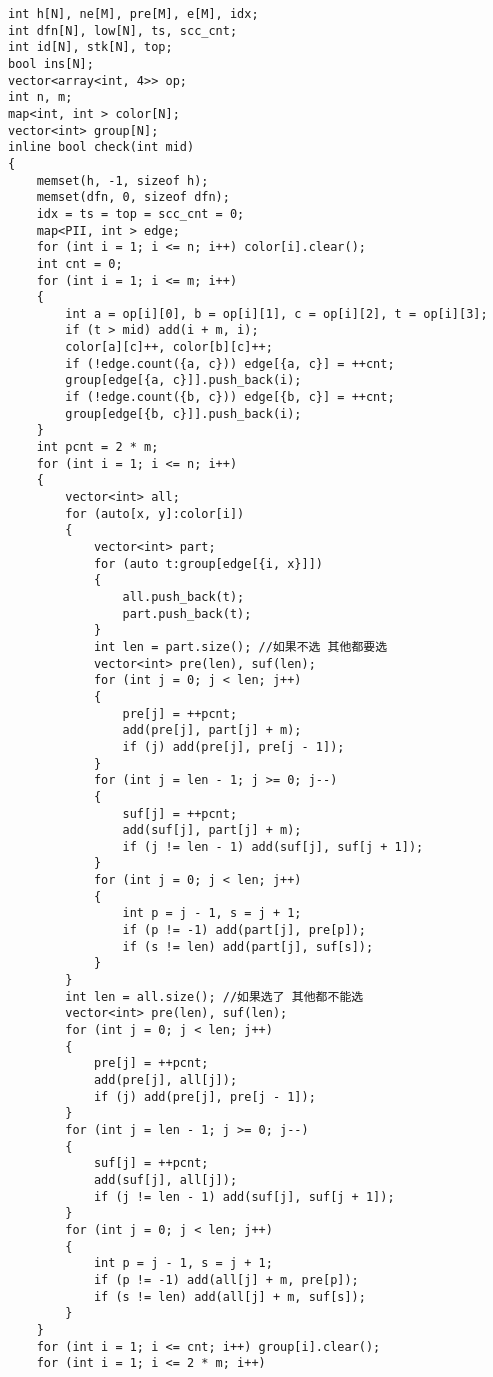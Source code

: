 \documentclass[a4paper, fontset=none]{ctexart}
\begin{document}
\begin{verbatim}
int h[N], ne[M], pre[M], e[M], idx;
int dfn[N], low[N], ts, scc_cnt;
int id[N], stk[N], top;
bool ins[N];
vector<array<int, 4>> op;
int n, m;
map<int, int > color[N];
vector<int> group[N];
inline bool check(int mid)
{
    memset(h, -1, sizeof h);
    memset(dfn, 0, sizeof dfn);
    idx = ts = top = scc_cnt = 0;
    map<PII, int > edge;
    for (int i = 1; i <= n; i++) color[i].clear();
    int cnt = 0;
    for (int i = 1; i <= m; i++)
    {
        int a = op[i][0], b = op[i][1], c = op[i][2], t = op[i][3];
        if (t > mid) add(i + m, i);
        color[a][c]++, color[b][c]++;
        if (!edge.count({a, c})) edge[{a, c}] = ++cnt;
        group[edge[{a, c}]].push_back(i);
        if (!edge.count({b, c})) edge[{b, c}] = ++cnt;
        group[edge[{b, c}]].push_back(i);
    }
    int pcnt = 2 * m;
    for (int i = 1; i <= n; i++)
    {
        vector<int> all;
        for (auto[x, y]:color[i])
        {
            vector<int> part;
            for (auto t:group[edge[{i, x}]])
            {
                all.push_back(t);
                part.push_back(t);
            }
            int len = part.size(); //如果不选 其他都要选
            vector<int> pre(len), suf(len);
            for (int j = 0; j < len; j++)
            {
                pre[j] = ++pcnt;
                add(pre[j], part[j] + m);
                if (j) add(pre[j], pre[j - 1]);
            }
            for (int j = len - 1; j >= 0; j--)
            {
                suf[j] = ++pcnt;
                add(suf[j], part[j] + m);
                if (j != len - 1) add(suf[j], suf[j + 1]);
            }
            for (int j = 0; j < len; j++)
            {
                int p = j - 1, s = j + 1;
                if (p != -1) add(part[j], pre[p]);
                if (s != len) add(part[j], suf[s]);
            }
        }
        int len = all.size(); //如果选了 其他都不能选
        vector<int> pre(len), suf(len);
        for (int j = 0; j < len; j++)
        {
            pre[j] = ++pcnt;
            add(pre[j], all[j]);
            if (j) add(pre[j], pre[j - 1]);
        }
        for (int j = len - 1; j >= 0; j--)
        {
            suf[j] = ++pcnt;
            add(suf[j], all[j]);
            if (j != len - 1) add(suf[j], suf[j + 1]);
        }
        for (int j = 0; j < len; j++)
        {
            int p = j - 1, s = j + 1;
            if (p != -1) add(all[j] + m, pre[p]);
            if (s != len) add(all[j] + m, suf[s]);
        }
    }
    for (int i = 1; i <= cnt; i++) group[i].clear();
    for (int i = 1; i <= 2 * m; i++)

\end{verbatim}
\end{document}
